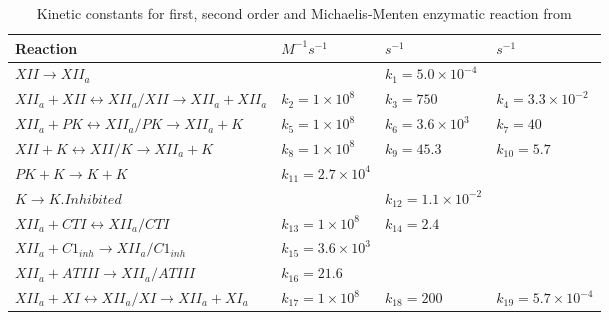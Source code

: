 \documentclass[%
 nofootinbib,
 amsmath,amssymb,
 aps,
 pra,
]{revtex4-1}
\begin{document}
\begin{table}[h]
\begin{tabular}{p{7 cm} p{3 cm} p{3 cm} p{3 cm}}
\hline
Reaction & $M^{-1}s^{-1}$ & $s^{-1}$ & $s^{-1}$ \\
\hline
$XII \rightarrow XII_{a}$ &   & $k_{1} = 5.0 \times 10^{-4} $ & \\
$XII_{a} + XII \leftrightarrow XII_{a} / XII \rightarrow XII_{a} + XII_{a}$ & $k_{2} = 1 \times 10^{8}$  & $k_{3} = 750$ & $k_{4} = 3.3 \times 10^{-2}$  \\
$XII_{a} + PK \leftrightarrow XII_{a}/PK \rightarrow XII_{a} + K $ & $k_{5} = 1 \times 10^{8}$  & $k_{6} = 3.6 \times 10^{3} $  & $k_{7} = 40$ \\
$XII + K \leftrightarrow XII/K \rightarrow XII_{a} + K$ & $k_{8} = 1 \times 10^{8}$ & $k_{9} = 45.3$ & $k_{10} = 5.7$ \\
$PK + K \rightarrow K + K$ &$k_{11} = 2.7 \times 10^{4}$ &   &  \\
$K \rightarrow K.Inhibited $ & $ $ & $k_{12}=1.1 \times 10^{-2}$  & \\
$XII_{a} + CTI \leftrightarrow XII_{a}/CTI $ & $k_{13} = 1 \times 10^{8}$& $k_{14}=2.4$   & \\
$XII_{a} + C1_{inh}\rightarrow XII_{a}/C1_{inh} $ & $k_{15} = 3.6 \times 10^{3}$   & \\
$XII_{a} + ATIII \rightarrow XII_{a}/ATIII $ & $k_{16} = 21.6$  & \\
$XII_{a} + XI \leftrightarrow XII_{a}/XI \rightarrow XII_{a} + XI_{a}$ & $k_{17} = 1 \times 10^{8}$ & $k_{18} = 200$ &  $k_{19} = 5.7 \times 10^{-4} $ \\
\hline
\end{tabular}
\caption{\label{Tab:Sourceterms} Kinetic constants for first, second order and Michaelis-Menten enzymatic reaction from \citet{Chatterjee:2010}}
\end{table}
\end{document}
